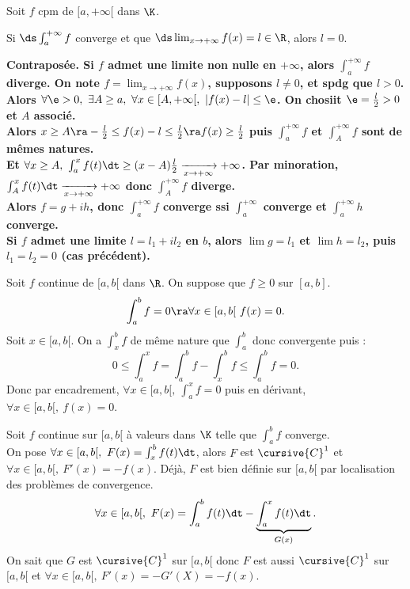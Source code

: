 \documentclass[11pt]{article}
\begin{document}
\begin{prop}{}{}
    Soit $f$ cpm de $[a,+\infty[$ dans $\K$.
    \begin{center}
        Si $\ds\int_a^{+\infty} f$ converge et que $\ds\lim_{x\to+\infty}f(x)=l\in\R$, alors $l=0$.
    \end{center} 
    \bf{Contraposée.} Si $f$ admet une limite non nulle en $+\infty$, alors $\int_a^{+\infty}f$ diverge.
    \tcblower
    On note $f=\lim_{x\to+\infty}f(x)$, supposons $l\neq0$, et spdg que $l>0$.\\
    Alors $\forall \e>0, ~ \exists A \geq a, ~ \forall x \in[A,+\infty[, ~ |f(x)-l|\leq \e$. On chosiit $\e=\frac{l}{2}>0$ et $A$ associé.\\
    \boxed{\K=\R} Alors $x\geq A \ra -\frac{l}{2} \leq f(x)-l \leq \frac{l}{2} \ra f(x)\geq\frac{l}{2}$ puis $\int_a^{+\infty}f$ et $\int_A^{+\infty}f$ sont de mêmes natures.\\
    Et $\forall x \geq A, ~ \int_a^x f(t)\dt \geq (x-A)\frac{l}{2}\xrightarrow[x\to+\infty]{}+\infty$. Par minoration, $\int_A^xf(t)\dt\xrightarrow[x\to+\infty]{}+\infty$ donc $\int_A^{+\infty} f$ diverge.\\
    \boxed{\K=\C} Alors $f=g+ih$, donc $\int_a^{+\infty} f$ converge ssi $\int_a^{+\infty}$ converge et $\int_a^{+\infty} h$ converge.\\
    Si $f$ admet une limite $l=l_1+il_2$ en $b$, alors $\lim g = l_1$ et $\lim h = l_2$, puis $l_1=l_2=0$ (cas précédent).
\end{prop}

\vspace*{-0.7cm}

\begin{prop}{}{}
    Soit $f$ continue de $[a,b[$ dans $\R$. On suppose que $f\geq0$ sur $[a,b]$.
    \begin{equation*}
        \int_a^b f = 0 \ra \forall x \in [a,b[ ~ f(x) = 0.
    \end{equation*}
    \tcblower
    Soit $x\in[a,b[$. On a $\int_x^bf$ de même nature que $\int_a^b$ donc convergente puis :
    \begin{equation*}
        0 \leq \int_a^x f = \int_a^b f - \int_x^b f \leq \int_a^b f = 0.
    \end{equation*}
    Donc par encadrement, $\forall x \in [a,b[, ~ \int_a^x f = 0$ puis en dérivant, $\forall x \in [a,b[, ~ f(x)=0$.
\end{prop}

\begin{prop}{}{}
    Soit $f$ continue sur $[a,b[$ à valeurs dans $\K$ telle que $\int_a^b f$ converge.\\
    On pose $\forall x \in [a,b[, ~ F(x)=\int_x^bf(t)\dt$, alors $F$ est $\cursive{C}^1$ et $\forall x \in [a,b[, ~ F'(x)=-f(x)$.
    \tcblower
    Déjà, $F$ est bien définie sur $[a,b[$ par localisation des problèmes de convergence.
    \begin{equation*}
        \forall x \in [a,b[, ~ F(x) = \int_a^b f(t)\dt - \underbrace{\int_a^xf(t)\dt}_{G(x)}.
    \end{equation*}
    On sait que $G$ est $\cursive{C}^1$ sur $[a,b[$ donc $F$ est aussi $\cursive{C}^1$ sur $[a,b[$ et $\forall x \in [a,b[, ~ F'(x)=-G'(X)=-f(x)$.
\end{prop}
\end{document}
